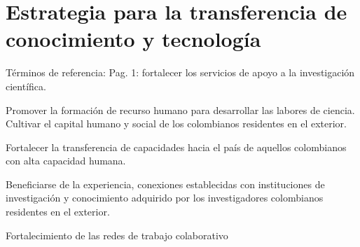 \section{Estrategia para la transferencia de conocimiento y tecnología}
\begin{instrucciones}
  Términos de referencia:
  Pag. 1: fortalecer los servicios de apoyo a la investigación científica.

  Promover la formación de recurso humano para desarrollar las labores de ciencia. 
Cultivar el  capital humano y social de los colombianos residentes en el exterior.

Fortalecer la transferencia de capacidades hacia el país de aquellos colombianos con alta capacidad humana. 

Beneficiarse de la experiencia, conexiones establecidas con instituciones de investigación y conocimiento adquirido por los investigadores colombianos residentes en el exterior.

Fortalecimiento de las redes de trabajo colaborativo
\end{instrucciones}